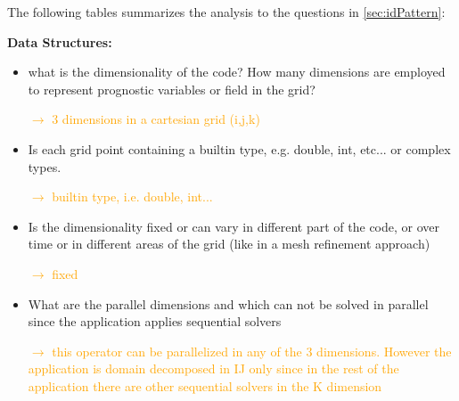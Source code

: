 \documentclass[a4paper,10pt]{scrartcl}
\begin{document}
The following tables summarizes the analysis to the questions in \cref{sec:idPattern}:


\textbf{Data Structures:}\newline
\begin{itemize}
	\item what is the dimensionality of the code? How many dimensions are employed to represent prognostic variables or field in the grid?
	
	\textcolor{orange}{$\rightarrow$ 3 dimensions in a cartesian grid (i,j,k)}
	
	\item Is each grid point containing a builtin type, e.g. double, int, etc... or complex types. 
	
	\textcolor{orange}{$\rightarrow$ builtin type, i.e. double, int...}	
	\item Is the dimensionality fixed or can vary in different part of the code, or over time or in different areas of the grid (like in a mesh refinement approach)
	
	\textcolor{orange}{$\rightarrow$ fixed} 
	\item What are the parallel dimensions and which can not be solved in parallel since the application applies sequential solvers
	
	\textcolor{orange}{$\rightarrow$ this operator can be parallelized in any of the 3 dimensions. However the application is domain decomposed in IJ only since in the rest of the application there are other sequential solvers in the K dimension} 
\end{itemize}
\end{document}

